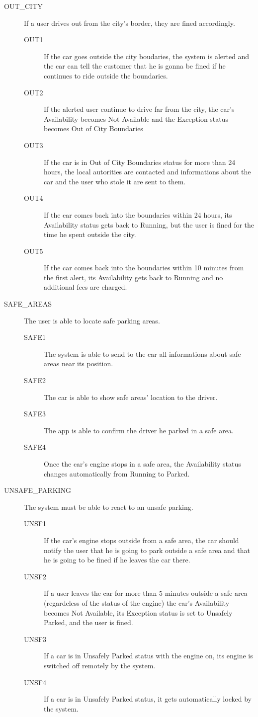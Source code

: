 \documentclass[11pt]{article} %
\begin{document}
\begin{description}
	\item[OUT\_CITY] If a user drives out from the city's border, they are fined accordingly.
	\begin{description}
	\item[OUT1] If the car goes outside the city boudaries, the system is alerted and the car can tell the customer that he is gonna be fined if he continues to ride outside the boundaries.
	\item[OUT2] If the alerted user continue to drive far from the city, the car's Availability becomes Not Available and the Exception status becomes Out of City Boundaries
	\item[OUT3] If the car is in Out of City Boundaries status for more than 24 hours, the local autorities are contacted and informations about the car and the user who stole it are sent to them.
	\item[OUT4] If the car comes back into the boundaries within 24 hours, its Availability status gets back to Running, but the user is fined for the time he spent outside the city.
	\item[OUT5] If the car comes back into the boundaries within 10 minutes from the first alert, its Availability gets back to Running and no additional fees are charged.
	\end{description}

	\item[SAFE\_AREAS] The user is able to locate safe parking areas.
	\begin{description}
	\item[SAFE1] The system is able to send to the car all informations about safe areas near its position.
	\item[SAFE2] The car is able to show safe areas' location to the driver.
	\item[SAFE3] The app is able to confirm the driver he parked in a safe area.
	\item[SAFE4] Once the car's engine stops in a safe area, the Availability status changes automatically from Running to Parked.
	\end{description}

	\item[UNSAFE\_PARKING] The system must be able to react to an unsafe parking.
	\begin{description}
	\item[UNSF1] If the car's engine stops outside from a safe area, the car should notify the user that he is going to park outside a safe area and that he is going to be fined if he leaves the car there.
	\item[UNSF2] If a user leaves the car for more than 5 minutes outside a safe area (regardeless of the status of the engine) the car's Availability becomes Not Available, its Exception status is set to Unsafely Parked, and the user is fined.
	\item[UNSF3] If a car is in Unsafely Parked status with the engine on, its engine is switched off remotely by the system.
	\item[UNSF4] If a car is in Unsafely Parked status, it gets automatically locked by the system.
	\end{description}


\end{description}
\end{document}
